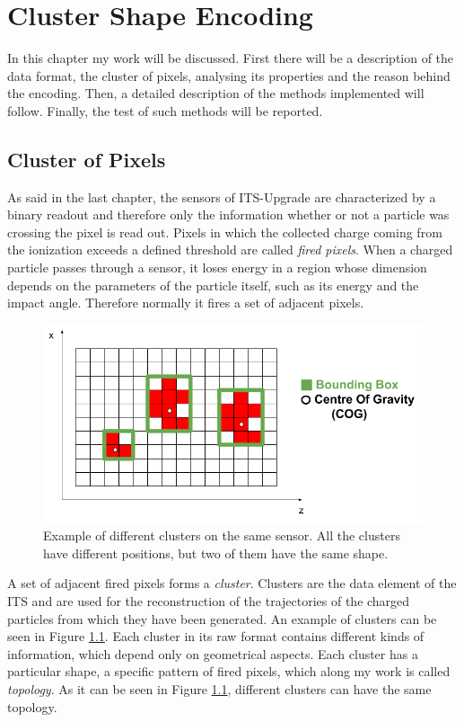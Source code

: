 \chapter{Cluster Shape Encoding}
In this chapter my work will be discussed. First there will be a description of the data format, the cluster of pixels, analysing its properties and the reason behind the encoding. Then, a detailed description of the methods implemented will follow. Finally, the test of such methods will be reported.
\section{Cluster of Pixels}
\label{sec:cluster}
As said in the last chapter, the sensors of ITS-Upgrade are characterized by a binary readout and therefore only the information whether or not a particle was crossing the pixel is read out. Pixels in which the collected charge coming from the ionization exceeds a defined threshold are called \textit{fired pixels}. When a charged particle passes through a sensor, it loses energy in a region whose dimension depends on the parameters of the particle itself, such as its energy and the impact angle. Therefore normally it fires a set of adjacent pixels.\\
%
\begin{figure}
  \centering
  \includegraphics[scale=0.6]{figures/cluster.png}
  \caption{Example of different clusters on the same sensor. All the clusters have different positions, but two of them have the same shape.}
  \label{fig:clusters}
\end{figure}
%
A set of adjacent fired pixels forms a \textit{cluster}. Clusters are the data element of the ITS and are used for the reconstruction of the trajectories of the charged particles from which they have been generated. An example of clusters can be seen in Figure \ref{fig:clusters}. Each cluster in its raw format contains different kinds of information, which depend only on geometrical aspects. Each cluster has a particular shape, a specific pattern of fired pixels, which along my work is called \textit{topology}. As it can be seen in Figure \ref{fig:clusters}, different clusters can have the same topology.\\
